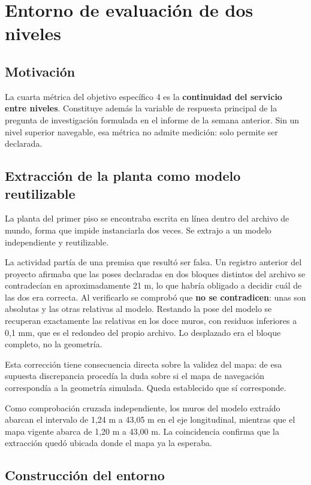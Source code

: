 \documentclass[12pt,letterpaper]{article}
\begin{document}
\section{Entorno de evaluación de dos niveles}

\subsection{Motivación}

La cuarta métrica del objetivo específico 4 es la \textbf{continuidad del servicio entre niveles}. Constituye además la variable de respuesta principal de la pregunta de investigación formulada en el informe de la semana anterior. Sin un nivel superior navegable, esa métrica no admite medición: solo permite ser declarada.

\subsection{Extracción de la planta como modelo reutilizable}

La planta del primer piso se encontraba escrita en línea dentro del archivo de mundo, forma que impide instanciarla dos veces. Se extrajo a un modelo independiente y reutilizable.

La actividad partía de una premisa que resultó ser falsa. Un registro anterior del proyecto afirmaba que las poses declaradas en dos bloques distintos del archivo se contradecían en aproximadamente 21 m, lo que habría obligado a decidir cuál de las dos era correcta. Al verificarlo se comprobó que \textbf{no se contradicen}: unas son absolutas y las otras relativas al modelo. Restando la pose del modelo se recuperan exactamente las relativas en los doce muros, con residuos inferiores a 0,1 mm, que es el redondeo del propio archivo. Lo desplazado era el bloque completo, no la geometría.

Esta corrección tiene consecuencia directa sobre la validez del mapa: de esa supuesta discrepancia procedía la duda sobre si el mapa de navegación correspondía a la geometría simulada. Queda establecido que sí corresponde.

Como comprobación cruzada independiente, los muros del modelo extraído abarcan el intervalo de 1,24 m a 43,05 m en el eje longitudinal, mientras que el mapa vigente abarca de 1,20 m a 43,00 m. La coincidencia confirma que la extracción quedó ubicada donde el mapa ya la esperaba.

\subsection{Construcción del entorno}
\end{document}
